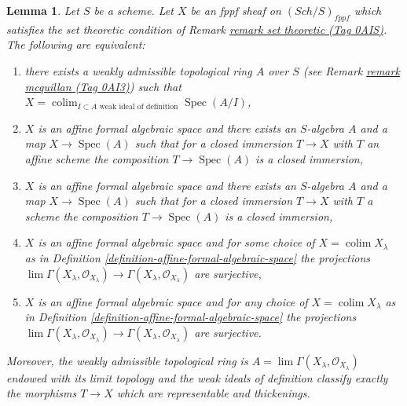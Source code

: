 \documentclass{amsart}
\theoremstyle{plain}
\newtheorem{lemma}[subsection]{Lemma}
\theoremstyle{definition}
\theoremstyle{remark}
\numberwithin{equation}{subsection}
\def\lim{\mathop{\mathrm{lim}}\nolimits}
\def\colim{\mathop{\mathrm{colim}}\nolimits}
\def\Spec{\mathop{\mathrm{Spec}}}
\def\Sch{\mathit{Sch}}
\begin{document}
\begin{lemma}
\label{lemma-mcquillan-affine-formal-algebraic-space}
Let $S$ be a scheme. Let $X$ be an fppf sheaf on $(\Sch/S)_{fppf}$
which satisfies the set theoretic condition of
Remark \href{https://stacks.math.columbia.edu/tag/0AIS}{remark set theoretic (Tag 0AIS)}.
The following are equivalent:
\begin{enumerate}
\item there exists a weakly admissible topological ring $A$ over $S$
(see Remark \href{https://stacks.math.columbia.edu/tag/0AI3}{remark mcquillan (Tag 0AI3)}) such that
$X = \colim_{I \subset A\text{ weak ideal of definition}} \Spec(A/I)$,
\item $X$ is an affine formal algebraic space and
there exists an $S$-algebra $A$ and a map $X \to \Spec(A)$
such that for a closed immersion $T \to X$ with $T$ an affine scheme
the composition $T \to \Spec(A)$ is a closed immersion,
\item $X$ is an affine formal algebraic space and
there exists an $S$-algebra $A$ and a map $X \to \Spec(A)$
such that for a closed immersion $T \to X$ with $T$ a scheme
the composition $T \to \Spec(A)$ is a closed immersion,
\item $X$ is an affine formal algebraic space and
for some choice of $X = \colim X_\lambda$ as in
Definition \ref{definition-affine-formal-algebraic-space}
the projections $\lim \Gamma(X_\lambda, \mathcal{O}_{X_\lambda})
\to \Gamma(X_\lambda, \mathcal{O}_{X_\lambda})$ are surjective,
\item $X$ is an affine formal algebraic space and for any choice
of $X = \colim X_\lambda$ as in
Definition \ref{definition-affine-formal-algebraic-space}
the projections $\lim \Gamma(X_\lambda, \mathcal{O}_{X_\lambda})
\to \Gamma(X_\lambda, \mathcal{O}_{X_\lambda})$ are surjective.
\end{enumerate}
Moreover, the weakly admissible topological ring is
$A = \lim \Gamma(X_\lambda, \mathcal{O}_{X_\lambda})$
endowed with its limit topology and the weak ideals of definition
classify exactly the morphisms $T \to X$ which are representable
and thickenings.
\end{lemma}
\end{document}
